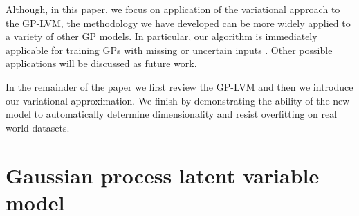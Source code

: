 \documentclass[twoside,times]{article}
\begin{document}
Although, in this paper, we focus on application of the variational
approach to the GP-LVM, the methodology we have developed can be more
widely applied to a variety of other GP models. In particular, our
algorithm is immediately applicable for training GPs with missing or
uncertain inputs \citep{Girard:uncertain01}. Other possible
applications will be discussed 
as future work.

In the remainder of the paper we first review the GP-LVM and then we
introduce our variational approximation. We finish by demonstrating
the ability of the new model to automatically determine dimensionality 
and resist overfitting on real world datasets. 

\section{Gaussian process latent variable model \label{sec:gplvm}}
\end{document}
